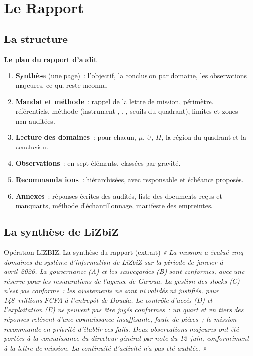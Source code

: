 \section{Le Rapport}
\label{sec:c11-rapport}

\subsection{La structure}

\begin{boxprocedure}
\textbf{Le plan du rapport d'audit}
\begin{enumerate}
    \item \textbf{Synthèse} (une page)~: l'objectif, la conclusion par
          domaine, les observations majeures, ce qui reste inconnu.
    \item \textbf{Mandat et méthode}~: rappel de la lettre de mission,
          périmètre, référentiels, méthode (instrument \OUI{}, \NON{},
          \NEK{}, seuils du quadrant), limites et zones non auditées.
    \item \textbf{Lecture des domaines}~: pour chacun, $\mu$, $U$, $H$, la
          région du quadrant et la conclusion.
    \item \textbf{Observations}~: en sept éléments, classées par gravité.
    \item \textbf{Recommandations}~: hiérarchisées, avec responsable et
          échéance proposés.
    \item \textbf{Annexes}~: réponses écrites des audités, liste des
          documents reçus et manquants, méthode d'échantillonnage,
          manifeste des empreintes.
\end{enumerate}
\end{boxprocedure}

\subsection{La synthèse de LiZbiZ}

\begin{boxscenario}{Opération LIZBIZ. La synthèse du rapport (extrait)}
\textit{« La mission a évalué cinq domaines du système d'information de
LiZbiZ sur la période de janvier à avril~2026. La gouvernance (A) et les
sauvegardes (B) sont conformes, avec une réserve pour les restaurations de
l'agence de Garoua. La gestion des stocks (C) n'est pas conforme~: les
ajustements ne sont ni validés ni justifiés, pour 148~millions FCFA à
l'entrepôt de Douala. Le contrôle d'accès (D) et l'exploitation (E) ne
peuvent pas être jugés conformes~: un quart et un tiers des réponses
relèvent d'une connaissance insuffisante, faute de pièces~; la mission
recommande en priorité d'établir ces faits. Deux observations majeures
ont été portées à la connaissance du directeur général par note du
12~juin, conformément à la lettre de mission. La continuité d'activité n'a
pas été auditée. »}
\end{boxscenario}

